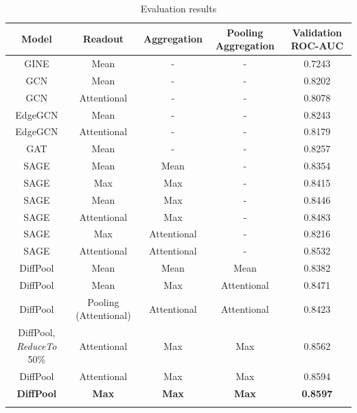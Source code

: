 \documentclass[journal]{IEEEtran}
\begin{document}
\onecolumn
\begin{table}[ht]
\centering
\begin{tabular}{@{}ccccc@{}}
\toprule
\textbf{Model}          & \textbf{Readout}      & \textbf{Aggregation} & \textbf{Pooling Aggregation} & \textbf{Validation ROC-AUC} \\ \midrule
GINE     & Mean        & -           & -           & 0.7243 \\
GCN      & Mean        & -           & -           & 0.8202 \\
GCN      & Attentional & -           & -           & 0.8078 \\
EdgeGCN  & Mean        & -           & -           & 0.8243 \\
EdgeGCN  & Attentional & -           & -           & 0.8179 \\
GAT      & Mean        & -           & -           & 0.8257 \\
SAGE     & Mean        & Mean        & -           & 0.8354 \\
SAGE     & Max         & Max         & -           & 0.8415 \\
SAGE     & Mean        & Max         & -           & 0.8446 \\
SAGE     & Attentional & Max         & -           & 0.8483 \\
SAGE     & Max         & Attentional & -           & 0.8216 \\
SAGE     & Attentional & Attentional & -           & 0.8532 \\
DiffPool & Mean        & Mean        & Mean        & 0.8382 \\
DiffPool & Mean        & Max         & Attentional & 0.8471 \\
DiffPool                & Pooling (Attentional) & Attentional          & Attentional                  & 0.8423                      \\
DiffPool, \textit{ReduceTo} 50\% & Attentional           & Max                  & Max                          & 0.8562                      \\
DiffPool & Attentional & Max         & Max         & 0.8594 \\
\textbf{DiffPool}       & \textbf{Max}          & \textbf{Max}         & \textbf{Max}                 & \textbf{0.8597}             \\ \bottomrule\\
\end{tabular}
\caption{Evaluation results}
\label{tab:eval-res}
\end{table}
\end{document}
